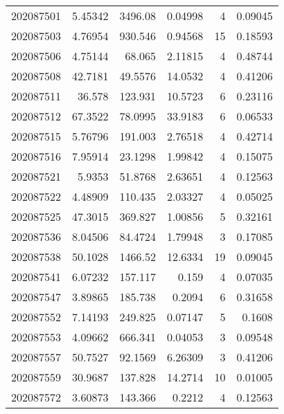\begin{tabular}{rrrrrr}
 202087501 &          5.45342 &     3496.08   &            0.04998 &           4 & 0.09045 \\
 202087503 &          4.76954 &      930.546  &            0.94568 &          15 & 0.18593 \\
 202087506 &          4.75144 &       68.065  &            2.11815 &           4 & 0.48744 \\
 202087508 &         42.7181  &       49.5576 &           14.0532  &           4 & 0.41206 \\
 202087511 &         36.578   &      123.931  &           10.5723  &           6 & 0.23116 \\
 202087512 &         67.3522  &       78.0995 &           33.9183  &           6 & 0.06533 \\
 202087515 &          5.76796 &      191.003  &            2.76518 &           4 & 0.42714 \\
 202087516 &          7.95914 &       23.1298 &            1.99842 &           4 & 0.15075 \\
 202087521 &          5.9353  &       51.8768 &            2.63651 &           4 & 0.12563 \\
 202087522 &          4.48909 &      110.435  &            2.03327 &           4 & 0.05025 \\
 202087525 &         47.3015  &      369.827  &            1.00856 &           5 & 0.32161 \\
 202087536 &          8.04506 &       84.4724 &            1.79948 &           3 & 0.17085 \\
 202087538 &         50.1028  &     1466.52   &           12.6334  &          19 & 0.09045 \\
 202087541 &          6.07232 &      157.117  &            0.159   &           4 & 0.07035 \\
 202087547 &          3.89865 &      185.738  &            0.2094  &           6 & 0.31658 \\
 202087552 &          7.14193 &      249.825  &            0.07147 &           5 & 0.1608  \\
 202087553 &          4.09662 &      666.341  &            0.04053 &           3 & 0.09548 \\
 202087557 &         50.7527  &       92.1569 &            6.26309 &           3 & 0.41206 \\
 202087559 &         30.9687  &      137.828  &           14.2714  &          10 & 0.01005 \\
 202087572 &          3.60873 &      143.366  &            0.2212  &           4 & 0.12563 \\

\end{tabular}
